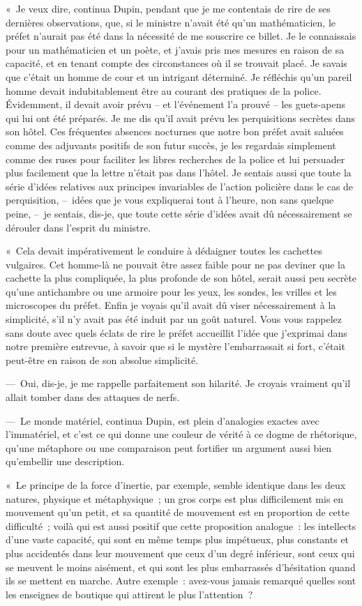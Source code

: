 \documentclass[french,twoside]{book} %
\begin{document}
« Je veux dire, continua Dupin, pendant que je me contentais de rire de ses dernières observations, que, si le ministre n’avait été qu’un mathématicien, le préfet n’aurait pas été dans la nécessité de me souscrire ce billet. Je le connaissais pour un mathématicien et un poète, et j’avais pris mes mesures en raison de sa capacité, et en tenant compte des circonstances où il se trouvait placé. Je savais que c’était un homme de cour et un intrigant déterminé. Je réfléchis qu’un pareil homme devait indubitablement être au courant des pratiques de la police. Évidemment, il devait avoir prévu – et l’événement l’a prouvé – les guets-apens qui lui ont été préparés. Je me dis qu’il avait prévu les perquisitions secrètes dans son hôtel. Ces fréquentes absences nocturnes que notre bon préfet avait saluées comme des adjuvants positifs de son futur succès, je les regardais simplement comme des ruses pour faciliter les libres recherches de la police et lui persuader plus facilement que la lettre n’était pas dans l’hôtel. Je sentais aussi que toute la série d’idées relatives aux principes invariables de l’action policière dans le cas de perquisition, – idées que je vous expliquerai tout à l’heure, non sans quelque peine, – je sentais, dis-je, que toute cette série d’idées avait dû nécessairement se dérouler dans l’esprit du ministre.\par
« Cela devait impérativement le conduire à dédaigner toutes les cachettes vulgaires. Cet homme-là ne pouvait être assez faible pour ne pas deviner que la cachette la plus compliquée, la plus profonde de son hôtel, serait aussi peu secrète qu’une antichambre ou une armoire pour les yeux, les sondes, les vrilles et les microscopes du préfet. Enfin je voyais qu’il avait dû viser nécessairement à la simplicité, s’il n’y avait pas été induit par un goût naturel. Vous vous rappelez sans doute avec quels éclats de rire le préfet accueillit l’idée que j’exprimai dans notre première entrevue, à savoir que si le mystère l’embarrassait si fort, c’était peut-être en raison de son absolue simplicité.\par
— Oui, dis-je, je me rappelle parfaitement son hilarité. Je croyais vraiment qu’il allait tomber dans des attaques de nerfs.\par
— Le monde matériel, continua Dupin, est plein d’analogies exactes avec l’immatériel, et c’est ce qui donne une couleur de vérité à ce dogme de rhétorique, qu’une métaphore ou une comparaison peut fortifier un argument aussi bien qu’embellir une description.\par
« Le principe de la force d’inertie, par exemple, semble identique dans les deux natures, physique et métaphysique ; un gros corps est plus difficilement mis en mouvement qu’un petit, et sa quantité de mouvement est en proportion de cette difficulté ; voilà qui est aussi positif que cette proposition analogue : les intellects d’une vaste capacité, qui sont en même temps plus impétueux, plus constants et plus accidentés dans leur mouvement que ceux d’un degré inférieur, sont ceux qui se meuvent le moins aisément, et qui sont les plus embarrassés d’hésitation quand ils se mettent en marche. Autre exemple : avez-vous jamais remarqué quelles sont les enseignes de boutique qui attirent le plus l’attention ?\par
\end{document}

